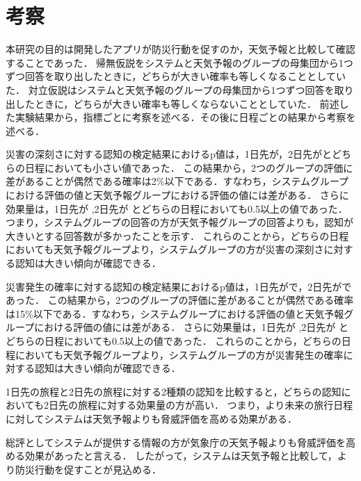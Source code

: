 \section{考察}
本研究の目的は開発したアプリが防災行動を促すのか，天気予報と比較して確認することであった．
帰無仮説をシステムと天気予報のグループの母集団から1つずつ回答を取り出したときに，どちらが大きい確率も等しくなることとしていた．
対立仮説はシステムと天気予報のグループの母集団から1つずつ回答を取り出したときに，どちらが大きい確率も等しくならないこととしていた．
前述した実験結果から，指標ごとに考察を述べる．その後に日程ごとの結果から考察を述べる．

災害の深刻さに対する認知の検定結果におけるp値は，1日先が\quad{}，2日先が\quad{}とどちらの日程においても小さい値であった．
この結果から，2つのグループの評価に差があることが偶然である確率は2\%以下である．すなわち，システムグループにおける評価の値と天気予報グループにおける評価の値には差がある．
さらに効果量は，1日先が \quad{},2日先が \quad{}とどちらの日程においても0.5以上の値であった．
つまり，システムグループの回答の方が天気予報グループの回答よりも，認知が大きいとする回答数が多かったことを示す．
これらのことから，どちらの日程においても天気予報グループより，システムグループの方が災害の深刻さに対する認知は大きい傾向が確認できる．

災害発生の確率に対する認知の検定結果におけるp値は，1日先が\quad{}で，2日先が\quad{}であった．
この結果から，2つのグループの評価に差があることが偶然である確率は15\%以下である．すなわち，システムグループにおける評価の値と天気予報グループにおける評価の値には差がある．
さらに効果量は，1日先が \quad{},2日先が \quad{}とどちらの日程においても0.5以上の値であった．
これらのことから，どちらの日程においても天気予報グループより，システムグループの方が災害発生の確率に対する認知は大きい傾向が確認できる．

1日先の旅程と2日先の旅程に対する2種類の認知を比較すると，どちらの認知においても2日先の旅程に対する効果量の方が高い．
つまり，より未来の旅行日程に対してシステムは天気予報よりも脅威評価を高める効果がある．

総評としてシステムが提供する情報の方が気象庁の天気予報よりも脅威評価を高める効果があったと言える．
したがって，システムは天気予報と比較して，より防災行動を促すことが見込める．
